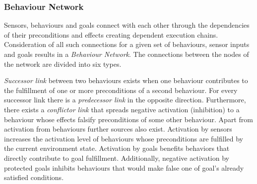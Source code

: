 \subsubsection{Behaviour Network}
Sensors, behaviours and goals connect with each other through the dependencies of their preconditions and effects creating dependent execution chains. Consideration of all such connections for a given set of behaviours, sensor inputs and goals results in a \textit{Behaviour Network}. The connections between the nodes of the network are divided into six types.\par
\textit{Successor link} between two behaviours exists when one behaviour contributes to the fulfillment of one or more preconditions of a second behaviour. For every successor link there is a \textit{predecessor link} in the opposite direction. Furthermore, there exists a \textit{conflictor link} that spreads negative activation (inhibition) to a behaviour whose effects falsify preconditions of some other behaviour. Apart from activation from behaviours further sources also exist. Activation by sensors increases the activation level of behaviours whose preconditions are fulfilled by the current environment state. Activation by goals benefits behaviors that directly contribute to goal fulfillment. Additionally, negative activation by protected goals inhibits behaviours that would make false one of goal's already satisfied conditions.\par 
